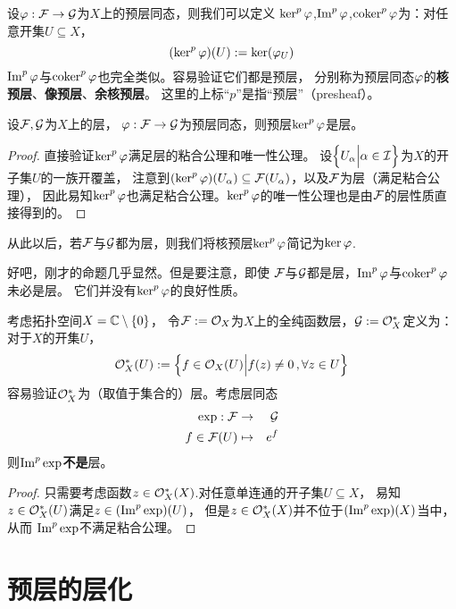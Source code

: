 设$\varphi:\mathcal{F}\to\mathcal{G}$为$X$上的预层同态，则我们可以定义
$\ker^p\varphi$,$\operatorname{Im}^p\varphi$,$\operatorname{coker}^p\varphi$为：对任意开集$U\subseteq X$，
$$(\ker^p\varphi)(U):=\ker(\varphi_U)$$
$\operatorname{Im}^p\varphi$与$\operatorname{coker}^p\varphi$也完全类似。容易验证它们都是预层，
分别称为预层同态$\varphi$的\textbf{核预层}、\textbf{像预层}、\textbf{余核预层}。
这里的上标“$p$”是指“预层”（presheaf）。

\begin{prop}设$\mathcal{F},\mathcal{G}$为$X$上的层，
$\varphi:\mathcal{F}\to\mathcal{G}$为预层同态，则预层$\ker^p\varphi$是层。
\end{prop}

\begin{proof}直接验证$\ker^p\varphi$满足层的粘合公理和唯一性公理。
设$\Big\{ U_\alpha \Big| \alpha\in\mathcal{I} \Big\}$为$X$的开子集$U$的一族开覆盖，
注意到$(\ker^p\varphi)(U_\alpha)\subseteq\mathcal{F}(U_\alpha)$，以及$\mathcal{F}$为层（满足粘合公理），
因此易知$\ker^p\varphi$也满足粘合公理。$\ker^p\varphi$的唯一性公理也是由$\mathcal{F}$的层性质直接得到的。
\end{proof}

从此以后，若$\mathcal{F}$与$\mathcal{G}$都为层，则我们将核预层$\ker^p\varphi$简记为$\ker\varphi$.

\begin{rem}好吧，刚才的命题几乎显然。但是要注意，即使
$\mathcal{F}$与$\mathcal{G}$都是层，$\operatorname{Im}^p\varphi$与$\operatorname{coker}^p\varphi$未必是层。
它们并没有$\ker^p\varphi$的良好性质。
\end{rem}

\begin{example}考虑拓扑空间$X=\mathbb{C}\setminus\{0\}$，
令$\mathcal{F}:=\mathcal{O}_X$为$X$上的全纯函数层，$\mathcal{G}:=\mathcal{O}^*_X$定义为：
对于$X$的开集$U$，
$$\mathcal{O}^*_X(U):=\Big\{ f\in\mathcal{O}_X(U) \Big| f(z)\neq 0\,,\forall z\in U \Big\}$$
容易验证$\mathcal{O}^*_X$为（取值于集合的）层。考虑层同态
\begin{eqnarray*}
\exp:\mathcal{F}&\to&\mathcal{G}\\
f\in\mathcal{F}(U)&\mapsto&e^f
\end{eqnarray*}
则$\operatorname{Im}^p\exp$\textbf{不是}层。
\label{指数预层同态}
\end{example}

\begin{proof}
只需要考虑函数$z\in\mathcal{O}_X^*(X)$.对任意单连通的开子集$U\subseteq X$，
易知$z\in\mathcal{O}^*_X(U)$满足$z\in(\operatorname{Im}^p\exp)(U)$，
但是$z\in\mathcal{O}_X^*(X)$并不位于$(\operatorname{Im}^p\exp)(X)$当中，从而
$\operatorname{Im}^p\exp$不满足粘合公理。
\end{proof}

\section{预层的层化}

